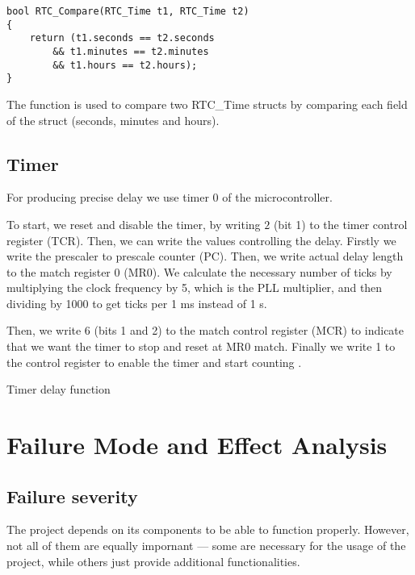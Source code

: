 \documentclass[10pt]{article}
\newcommand{\code}[3]{}
\begin{document}
	\begin{lstlisting}[caption = {RTC\_Time struct comparator function}]
bool RTC_Compare(RTC_Time t1, RTC_Time t2)
{
	return (t1.seconds == t2.seconds
		&& t1.minutes == t2.minutes
		&& t1.hours == t2.hours);
}
	\end{lstlisting}
	The function is used to compare two RTC\_Time structs by comparing each field of the struct (seconds, minutes and hours).

    \subsection{Timer}

    For producing precise delay we use timer 0 of the microcontroller.
    
    To start, we reset and disable the timer, by writing $2$ (bit 1) to the timer control register (TCR). 
    Then, we can write the values controlling the delay.
    Firstly we write the prescaler to prescale counter (PC).
    Then, we write actual delay length to the match register 0 (MR0).
    We calculate the necessary number of ticks by multiplying the clock frequency by 5, which is the PLL multiplier, and then dividing by 1000 to get ticks per 1 ms instead of 1 s.

    Then, we write 6 (bits 1 and 2) to the match control register (MCR) to indicate that we want the timer to stop and reset at MR0 match.
    Finally we write 1 to the control register to enable the timer and start counting \cite[p.251]{lpc2148-manual}.

    \begin{program}[H]
        \code{11}{19}{timer.h}
        \caption{Timer delay function}
    \end{program}

    \section{Failure Mode and Effect Analysis}

    \subsection{Failure severity}

    The project depends on its components to be able to function properly.
    However, not all of them are equally impornant --- some are necessary for the usage of the project,
    while others just provide additional functionalities.
\end{document}
